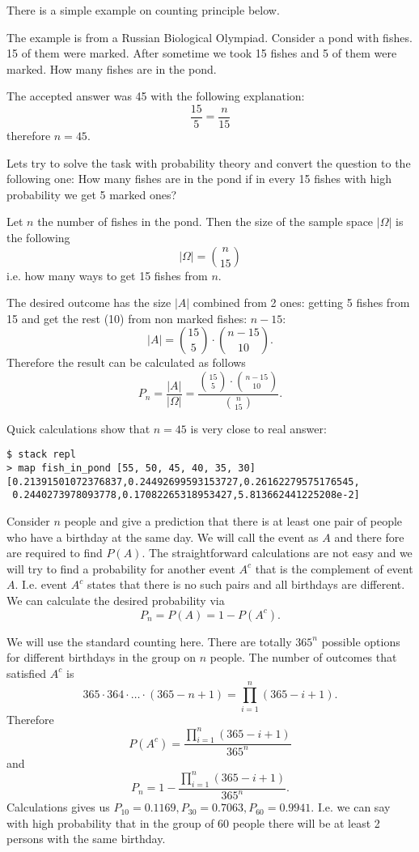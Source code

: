 There is a simple example on counting principle below.
\begin{example}
The example is from a Russian Biological Olympiad. Consider a pond with
fishes. 15 of them were marked. After sometime we took 15 fishes and 5
of them were marked. How many fishes are in the pond.

The accepted answer was 45 with the following explanation: 
\[
\frac{15}{5} = \frac{n}{15}
\]
therefore $n=45$.

Lets try to solve the task with probability theory and convert the
question to the following one: How many fishes are in the pond if in
every 15 fishes with high probability we get 5 marked ones?

Let $n$ the number of fishes in the pond. Then the size of the sample
space $\left|\Omega\right|$ is the following
\[
\left|\Omega\right| = \binom{n}{15}
\]
i.e. how many ways to get 15 fishes from $n$.

The desired outcome has the size $\left|A\right|$ combined from 2
ones: getting 5 fishes from 15 and get the rest (10) from non marked
fishes: $n - 15$:
\[
\left|A\right| = \binom{15}{5} \cdot \binom{n - 15}{10}.
\]
Therefore the result can be calculated as follows
\[
P_n = \frac{\left|A\right|}{\left|\Omega\right|} = 
\frac{\binom{15}{5} \cdot \binom{n - 15}{10}}{\binom{n}{15}}.
\]

Quick calculations 
\cite{github:mathexperiments_ivanmurashko}
show that $n=45$ is very close to real answer: 
\begin{verbatim}
$ stack repl
> map fish_in_pond [55, 50, 45, 40, 35, 30]
[0.21391501072376837,0.24492699593153727,0.26162279575176545,
 0.2440273978093778,0.17082265318953427,5.813662441225208e-2]
\end{verbatim}

\end{example}


\begin{example}
Consider $n$ people and give a prediction that there is at least one
pair of people who have a birthday at the same day. We will call the
event as $A$ and there fore are required to find $P(A)$. 
The straightforward calculations are not easy and we will try to find
a probability for another event $A^c$ that is the complement of event
$A$. I.e. event $A^c$ states that there is no such pairs and all
birthdays are different. We can calculate the desired probability via 
\[
P_n = P(A) = 1 - P(A^c).
\]

We will use the standard counting here. There are totally $365^n$
possible options for different birthdays in the group on $n$ people.
The number of outcomes that satisfied $A^c$ is 
\[
365 \cdot 364 \cdot \dots \cdot (365 -n +1) = 
\prod_{i = 1}^n (365 - i + 1).
\]
Therefore
\[
P(A^c) = \frac{\prod_{i = 1}^n (365 - i + 1)}{365^n}
\]
and
\[
P_n = 1 - \frac{\prod_{i = 1}^n (365 - i + 1)}{365^n}.
\]
Calculations gives us
$P_{10} = 0.1169, P_{30} = 0.7063, P_{60} = 0.9941$. I.e. we can say
with high probability
that in the group of 60 people there will be at least 2 persons with
the same birthday.
\end{example}

